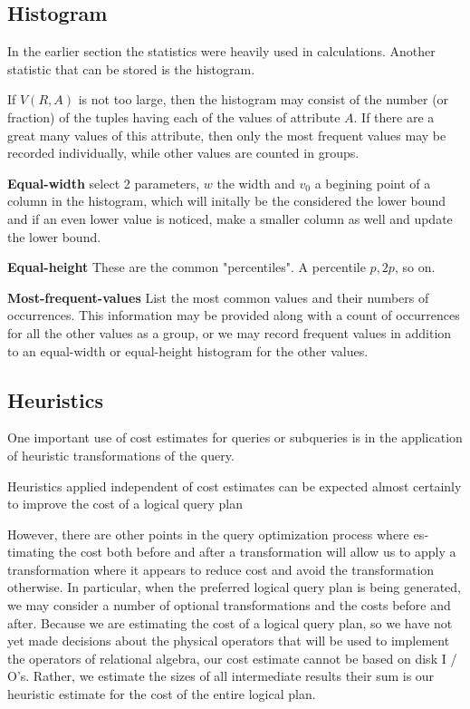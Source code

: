 \subsection{Histogram}
In the earlier section the statistics were heavily used in calculations. Another statistic that can be stored is the histogram.
\par If $V (R, A)$ is not too large, then the histogram may consist of the number (or fraction) of the tuples having each of the values of attribute $A$. If there are a great many values of this attribute, then only the most frequent values may be recorded individually, while other values are counted in groups.
\par \textbf{Equal-width} select 2 parameters, $w$ the width and $v_0$ a begining point of a column in the histogram, which will initally be the considered the lower bound and if an even lower value is noticed, make a smaller column as well and update the lower bound.
\par \textbf{Equal-height} These are the common "percentiles". A percentile $p, 2p$, so on.
\par \textbf{Most-frequent-values} List the most common values and their numbers of occurrences. This information may be provided along with a count of occurrences for all the other values as a group, or we may record frequent values in addition to an equal-width or equal-height histogram for the other values.

\subsection{Heuristics}
One important use of cost estimates for queries or subqueries is in the appli­cation of heuristic transformations of the query.
\par Heuristics applied independent of cost estimates can be expected almost certainly to improve the cost of a logical query plan
\par However, there are other points in the query optimization process where es­timating the cost both before and after a transformation will allow us to apply a transformation where it appears to reduce cost and avoid the transformation otherwise. In particular, when the preferred logical query plan is being generated, we may consider a number of optional transformations and the costs before and after. Because we are estimating the cost of a logical query plan, so we have not yet made decisions about the physical operators that will be used to implement the operators of relational algebra, our cost estimate cannot be based on disk I / O's. Rather, we estimate the sizes of all intermediate results their sum is our heuristic estimate for the cost of the entire logical plan.

